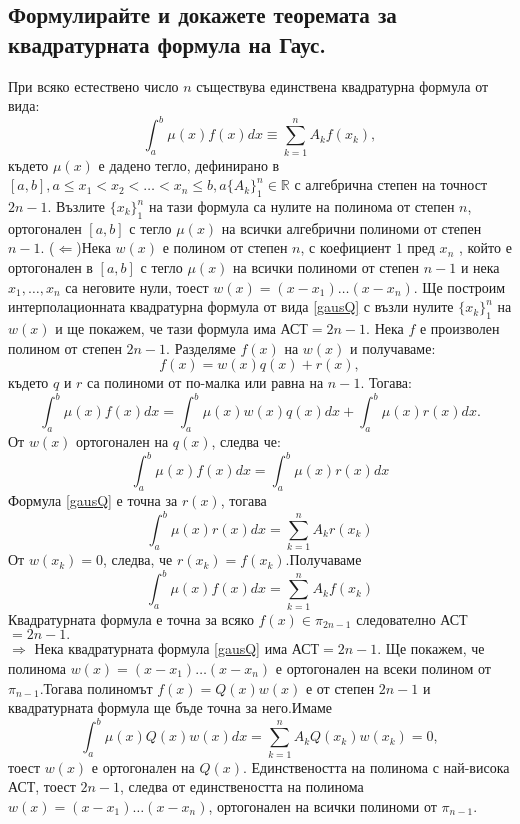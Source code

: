\documentclass[12pt]{article}
\numberwithin{equation}{subsection}
\numberwithin{theorem}{subsection}
\numberwithin{definition}{subsection}
\numberwithin{corollary}{subsection}
\begin{document}
\subsection{Формулирайте и докажете теоремата за квадратурната формула на Гаус.}
  \theorem При всяко естествено число $n$ съществува единствена квадратурна формула от вида:
    \begin{equation}\label{gausQ}
      \int_{a}^{b}\mu(x)f(x)dx\equiv\sum_{k=1}^{n}A_kf(x_k),
    \end{equation}
  където $\mu(x)$ е дадено тегло, дефинирано в $[a,b], a\leq x_1<x_2<\ldots<x_n\leq b, a \{A_k\}_1^n\in\mathbb R$ с алгебрична степен на точност $2n-1$. Възлите $\{x_k\}_1^n$ на тази формула са нулите на полинома от степен $n$, ортогонален $[a,b]$ с тегло $\mu(x)$ на всички алгебрични полиноми от степен $n-1$.
  \proof
  ($\Leftarrow$)Нека $w(x)$ е полином от степен $n$, с коефициент $1$ пред $x_n$ , който е ортогонален в $[a,b]$ с тегло $\mu(x)$ на всички полиноми от степен $n-1$ и нека $x_1,\ldots,x_n$ са неговите нули, тоест $w(x) = (x-x_1)\ldots(x-x_n)$. Ще построим интерполационната квадратурна формула от вида \ref{gausQ} с възли нулите $\{x_k\}_1^n$ на $w(x)$ и  ще покажем, че тази формула има АСТ$=2n-1$.
  Нека $f$ е произволен полином от степен $2n-1$. Разделяме $f(x)$ на $w(x)$ и получаваме:
  \begin{equation}
    f(x)=w(x)q(x)+r(x),
  \end{equation}
  където $q$ и $r$ са полиноми от по-малка или равна на $n-1$. Тогава:
  \begin{equation*}
    \int_{a}^{b}\mu(x)f(x)dx=\int_{a}^{b}\mu(x)w(x)q(x)dx+\int_{a}^{b}\mu(x)r(x)dx.
  \end{equation*}
  От $w(x)$ ортогонален на $q(x)$, следва че:
  \begin{equation*}
    \int_{a}^{b}\mu(x)f(x)dx=\int_{a}^{b}\mu(x)r(x)dx
  \end{equation*}
  Формула \ref{gausQ} е точна за $r(x)$, тогава
  \begin{equation*}
    \int_{a}^{b}\mu(x)r(x)dx=\sum_{k=1}^{n}A_kr(x_k)
  \end{equation*}
  От $w(x_k)=0$, следва, че $r(x_k)=f(x_k)$.Получаваме
  \begin{equation*}
    \int_{a}^{b}\mu(x)f(x)dx = \sum_{k=1}^{n}A_kf(x_k)
  \end{equation*}
  Квадратурната формула е точна за всяко $f(x)\in\pi_{2n-1}$ следователно АСТ$=2n-1.$\\
  $\Rightarrow$
  Нека квадратурната формула \ref{gausQ} има АСТ$=2n-1$. Ще покажем, че полинома $w(x)=(x-x_1)\ldots(x-x_n)$ е ортогонален на всеки полином от $\pi_{n-1}$.Тогава полиномът $f(x)=Q(x)w(x)$ е от степен $2n-1$ и квадратурната формула ще бъде точна за него.Имаме
  \begin{equation*}
    \int_{a}^{b}\mu(x)Q(x)w(x)dx=\sum_{k=1}^{n}A_kQ(x_k)w(x_k)=0,
  \end{equation*}
  тоест $w(x)$ е ортогонален на $Q(x)$.
  Единствеността на полинома с най-висока АСТ,  тоест $2n-1$, следва от единствеността на полинома $w(x)=(x-x_1)\ldots(x-x_n)$, ортогонален на всички полиноми от $\pi_{n-1}$.
\end{document}
